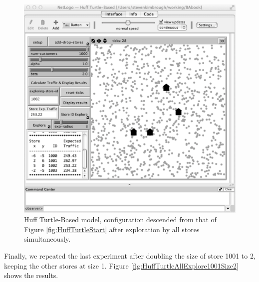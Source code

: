 \begin{figure}[htbp] %
   \centering
   \includegraphics[width=\textwidth]{figures/HuffTurtleAllExplore.pdf}  
   \caption{Huff Turtle-Based model, configuration descended from that of Figure \ref{fig:HuffTurtleStart} after exploration by all stores simultaneously.} %
   \label{fig:HuffTurtleAllExplore}
\end{figure}
\newpage\clearpage


Finally, we repeated the last experiment after doubling the size of store 1001 to 2, keeping the other stores at size 1. Figure \ref{fig:HuffTurtleAllExplore1001Size2} shows the results.



